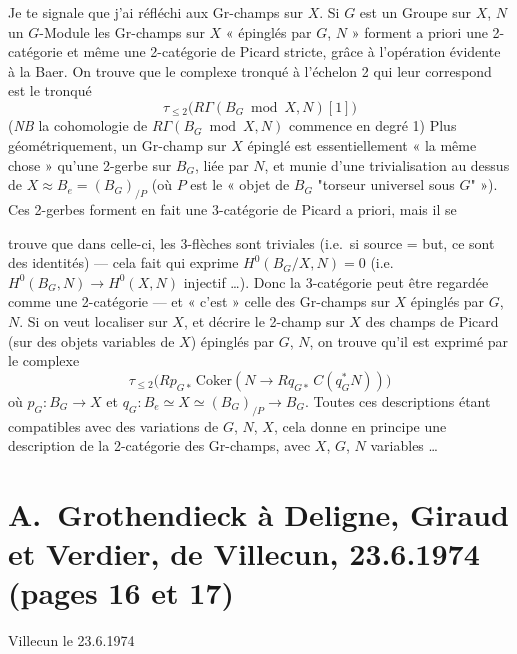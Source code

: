 \documentclass[11pt,a4paper]{article}
\begin{document}
Je te signale que j'ai réfléchi aux Gr-champs sur $X$. Si $G$ est un Groupe
sur $X$, $N$ un $G$-Module les Gr-champs sur $X$ « épinglés par $G$, $N$ »
forment a priori une 2-catégorie et même une 2-catégorie de Picard stricte,
grâce à l'opération évidente à la Baer. On trouve que le complexe  tronqué à l'échelon 2 qui leur correspond est le tronqué
\[ \tau_{\leq 2}\bigl( R\Gamma(B_G \bmod X, N)[1] \bigr) \]
(\emph{NB} la cohomologie de $R\Gamma(B_G \bmod X, N)$ commence en degré 1)
Plus géométriquement, un Gr-champ sur $X$ épinglé  est
essentiellement « la même chose » qu'une 2-gerbe sur $B_G$, liée par $N$,
et \struck{\ill{}} munie d'une trivialisation au dessus de $X \approx B_e =
(B_G)_{/P}$ (où $P$ est le « objet de $B_G$ "torseur universel sous $G$" »).
Ces 2-gerbes forment en fait une 3-catégorie de Picard a priori, mais il se


trouve que dans celle-ci, les 3-flèches sont triviales (i.e.\ si source =
but, ce sont des identités) --- cela  fait qui exprime
$H^0(B_G/X, N) = 0$ (i.e.\ $H^0(B_G, N) \to H^0(X, N)$ injectif …). Donc la
3-catégorie peut être regardée comme une 2-catégorie --- et « c'est » celle
des Gr-champs sur $X$ épinglés par $G$, $N$. Si on veut localiser sur $X$,
et décrire le 2-champ  sur $X$ des champs de Picard (sur des
objets variables de $X$) épinglés par $G$, $N$, on trouve qu'il est exprimé
par le complexe
\[ \tau_{\leq 2}\bigl( R p_{G*}\, \mathrm{Coker}(N \to R q_{G*}\, C(q_G^* N)) \bigr) \]
où $p_G : B_G \to X$ et $q_G : B_e \simeq X \simeq (B_G)_{/P} \to B_G$.
Toutes ces descriptions étant compatibles avec des variations de $G$, $N$,
$X$, cela donne en principe une description de la 2-catégorie des
Gr-champs, avec $X$, $G$, $N$ variables …


\section*{A.\ Grothendieck à Deligne, Giraud et Verdier, de Villecun, 23.6.1974 (pages 16 et 17)}


Villecun le 23.6.1974
\end{document}
